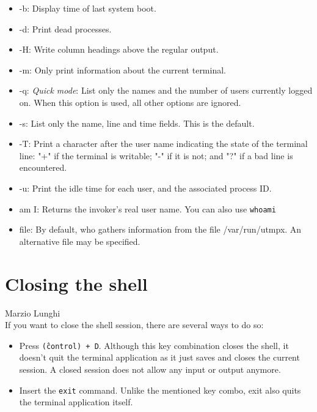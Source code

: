 \documentclass[hidelinks,12pt,a4paper,numbers=enddot]{scrartcl}
\begin{document}
\begin{itemize}
    \item -b: Display time of last system boot.
    \item  -d: Print dead processes.
    \item -H: Write column headings above the regular output.
    \item -m: Only print information about the current terminal.
    \item -q: \emph{Quick mode}: List only the names and the number of users currently logged on.
        When this option is used, all other options are
        ignored.
    
    \item -s: List only the name, line and time fields. This is the default.
    \item -T: Print a character after the user name indicating the state of the
        terminal line: "+" if the terminal is writable; "-" if it is not;
        and "?" if a bad line is encountered.
    
    \item -u: Print the idle time for each user, and the associated process ID.
    \item am I: Returns the invoker's real user name. You can also use \texttt{whoami}
    \item file: By default, who gathers information from the file /var/run/utmpx.
        An alternative file may be specified.
    
\end{itemize}

\section{Closing the shell}


\large Marzio Lunghi \normalsize\\


If you want to close the shell session, there are several ways to do so:

\begin{itemize}
    \item Press \texttt{\^ (control) + D}. Although this key combination closes the shell,
        it doesn't quit the terminal application as it just saves and closes the current session.
        A closed session does not allow any input or output anymore.
    
    \item Insert the \texttt{exit} command. Unlike the mentioned key combo, exit also quits
        the terminal application itself.
    
\end{itemize}
\end{document}
